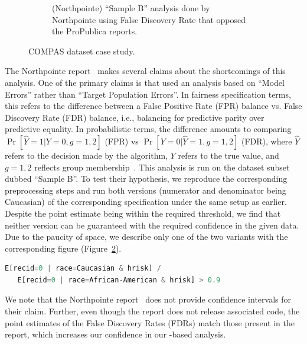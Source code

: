 \begin{figure}
\begin{subfigure}{0.48\linewidth}
        \caption{(Northpointe) ``Sample B'' analysis done by Northpointe using False Discovery Rate that opposed the ProPublica reports.}
        \label{fig:casestudy:compas:northpointe}
    \end{subfigure}
    \caption{COMPAS dataset case study.}
\end{figure}


The Northpointe report~\citep{dieterich2016compas} makes several claims about the shortcomings of this analysis.
One of the primary claims is that \citet{angwin2016machine} used an analysis based on ``Model Errors'' rather than ``Target Population Errors''.
In fairness specification terms, this refers to the difference between a False Positive Rate (FPR) balance vs. False Discovery Rate (FDR) balance, i.e., balancing for predictive parity over predictive equality. 
In probabilistic terms, the difference amounts to comparing $\Pr[\hat{Y} = 1 | Y = 0, g=1, 2]$ (FPR) vs $\Pr[Y = 0 | \hat{Y} = 1, g=1, 2]$ (FDR), where $\hat{Y}$ refers to the decision made by the algorithm, $Y$ refers to the true value, and $g = 1, 2$ reflects group membership~\citep{verma2018fairness}.
This analysis is run on the dataset subset dubbed ``Sample B''.
To test their hypothesis, we reproduce the corresponding preprocessing steps and run both versions (numerator and denominator being Caucasian) of the corresponding specification under the same setup as earlier. 
Despite the point estimate being within the required threshold, we find that neither version can be guaranteed with the required confidence in the given data.
Due to the paucity of space, we describe only one of the two variants with the corresponding figure (Figure~\ref{fig:casestudy:compas:northpointe}).
\begin{lstlisting}[columns=flexible, language=Python]
   E[recid=0 | race=Caucasian & hrisk] /
   E[recid=0 | race=African-American & hrisk] > 0.9
\end{lstlisting}


We note that the Northpointe report~\citep{dieterich2016compas} does not provide confidence intervals for their claim. 
Further, even though the report does not release associated code, the point estimates of the False Discovery Rates (FDRs) match those present in the report, which increases our confidence in our \AVOIRmethodname{}-based analysis. 

